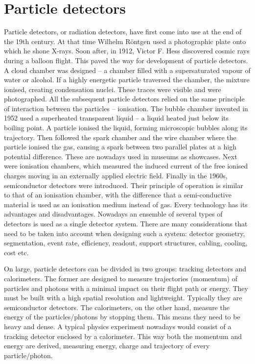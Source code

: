 \section{Particle detectors}
Particle detectors, or radiation detectors, have first come into use at the end of the 19th century. At that time Wilhelm R\"ontgen used a photographic plate onto which he shone X-rays. Soon after, in 1912, Victor F. Hess discovered cosmic rays during a balloon flight. This paved the way for development of particle detectors. A cloud chamber was designed -- a chamber filled with a supersaturated vapour of water or alcohol. If a highly energetic particle traversed the chamber, the mixture ionised, creating condensation nuclei. These traces were visible and were photographed. All the subsequent particle detectors relied on the same principle of interaction between the particles -- ionisation. The bubble chamber invented in 1952 used a superheated transparent liquid -- a liquid heated just below its boiling point. A particle ionised the liquid, forming microscopic bubbles along its trajectory. Then followed the spark chamber and the wire chamber where the particle ionised the gas, causing a spark between two parallel plates at a high potential difference. These are nowadays used in museums as showcases. Next were ionisation chambers, which measured the induced current of the free ionised charges moving in an externally applied electric field. Finally in the 1960s, semiconductor detectors were introduced. Their principle of operation is similar to that of an ionisation chamber, with the difference that a semi-conductive material is used as an ionisation medium instead of gas. Every technology has its advantages and disadvantages. Nowadays an ensemble of several types of detectors is used as a single detector system. There are many considerations that need to be taken into account when designing such a system: detector geometry, segmentation, event rate, efficiency, readout, support structures, cabling, cooling, cost etc.

On large, particle detectors can be divided in two groups: tracking detectors and calorimeters. The former are designed to measure trajectories (momentum) of particles and photons with a minimal impact on their flight path or energy. They must be built with a high spatial resolution and lightweight. Typically they are semiconductor detectors. The calorimeters, on the other hand, measure the energy of the particles/photons by stopping them. This means they need to be heavy and dense. A typical physics experiment nowadays would consist of a tracking detector enclosed by a calorimeter. This way both the momentum and energy are derived, measuring energy, charge and trajectory of every particle/photon.


